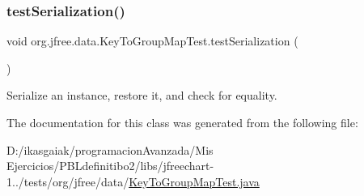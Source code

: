 \subsubsection{\texorpdfstring{test\+Serialization()}{testSerialization()}}
{\footnotesize\ttfamily void org.\+jfree.\+data.\+Key\+To\+Group\+Map\+Test.\+test\+Serialization (\begin{DoxyParamCaption}{ }\end{DoxyParamCaption})}

Serialize an instance, restore it, and check for equality. 

The documentation for this class was generated from the following file\+:\begin{DoxyCompactItemize}
\item 
D\+:/ikasgaiak/programacion\+Avanzada/\+Mis Ejercicios/\+P\+B\+Ldefinitibo2/libs/jfreechart-\/1../tests/org/jfree/data/\mbox{\hyperlink{_key_to_group_map_test_8java}{Key\+To\+Group\+Map\+Test.\+java}}\end{DoxyCompactItemize}
